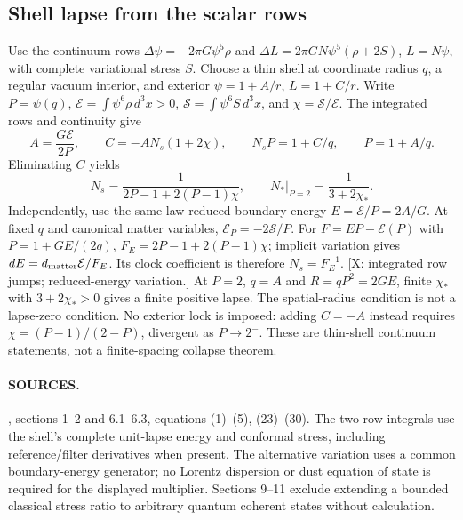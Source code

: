 \subsection*{Shell lapse from the scalar rows}
Use the continuum rows
$\Delta\psi=-2\pi G\psi^5\rho$ and
$\Delta L=2\pi GN\psi^5(\rho+2S)$, $L=N\psi$,
with complete variational stress $S$.
Choose a thin shell at coordinate radius $q$, a regular vacuum
interior, and exterior $\psi=1+A/r$, $L=1+C/r$.
Write $P=\psi(q)$,
$\mathcal E=\int\psi^6\rho\,d^3x>0$,
$\mathcal S=\int\psi^6S\,d^3x$, and $\chi=\mathcal S/\mathcal E$.
The integrated rows and continuity give
\[
 A=\frac{G\mathcal E}{2P},\qquad
 C=-AN_s(1+2\chi),\qquad
 N_sP=1+C/q,\qquad P=1+A/q .
\]
Eliminating $C$ yields
\[
 N_s=\frac1{2P-1+2(P-1)\chi},
 \qquad N_*\big|_{P=2}=\frac1{3+2\chi_*}.
\]
Independently, use the same-law reduced boundary energy
$E=\mathcal E/P=2A/G$.
At fixed $q$ and canonical matter variables,
$\mathcal E_P=-2\mathcal S/P$.
For $F=EP-\mathcal E(P)$ with $P=1+GE/(2q)$,
$F_E=2P-1+2(P-1)\chi$; implicit variation gives
$dE=d_{\rm matter}\mathcal E/F_E$.
Its clock coefficient is therefore $N_s=F_E^{-1}$.
[X: integrated row jumps; reduced-energy variation.]
At $P=2$, $q=A$ and $R=qP^2=2GE$, finite $\chi_*$ with
$3+2\chi_*>0$ gives a finite positive lapse.
The spatial-radius condition is not a lapse-zero condition.
No exterior lock is imposed: adding $C=-A$ instead requires
$\chi=(P-1)/(2-P)$, divergent as $P\to2^-$.
These are thin-shell continuum statements, not a finite-spacing
collapse theorem.

\paragraph*{SOURCES.}
\begingroup\footnotesize
{},
sections 1--2 and 6.1--6.3, equations (1)--(5), (23)--(30).
The two row integrals use the shell's complete unit-lapse energy and
conformal stress, including reference/filter derivatives when present.
The alternative variation uses a common boundary-energy generator;
no Lorentz dispersion or dust equation of state is required for the
displayed multiplier.
Sections 9--11 exclude extending a bounded classical stress ratio
to arbitrary quantum coherent states without calculation.
\endgroup
